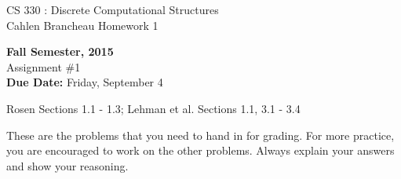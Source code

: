 \setlength{\oddsidemargin}{12pt}
\setlength{\textwidth}{6.5in}
\setlength{\textheight}{9in}
\pagestyle{empty}
\setlength{\parskip}{7pt plus 2pt minus 2pt}



\begin{center}
{{\large CS 330 : Discrete Computational Structures}}\\
Cahlen Brancheau Homework 1

\vspace*{1cm}

{\bf Fall Semester, 2015}\\

{\sc Assignment \#1}\\
{\bf Due Date:}  Friday, September 4
\end{center}

 Rosen Sections 1.1 - 1.3; Lehman et al. Sections 1.1,  3.1 - 3.4

These are the problems that you need to hand in for grading. For more
practice, you are encouraged to work on the other problems. Always
explain your answers and show your reasoning.

